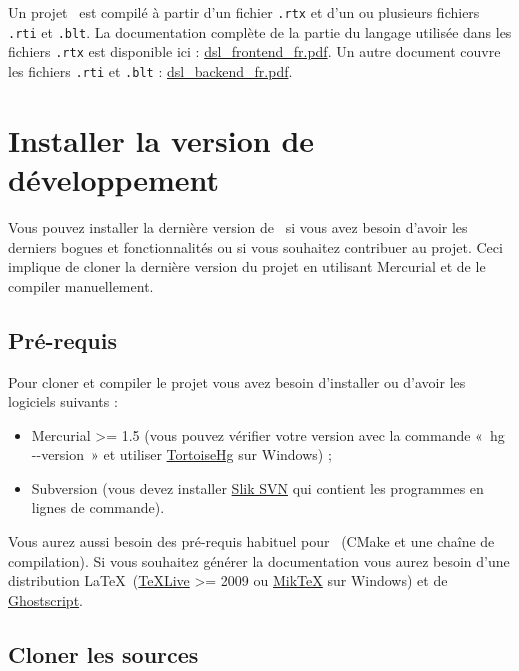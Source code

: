\documentclass[francais]{rtxarticle}
\begin{document}
Un projet \rtx\ est compilé à partir d'un fichier \texttt{.rtx} et d'un ou
plusieurs fichiers \texttt{.rti} et \texttt{.blt}. La documentation complète de
la partie du langage utilisée dans les fichiers \texttt{.rtx} est disponible
ici : \href{http://rathaxes.googlecode.com/files/dsl_frontend_fr.pdf}{dsl\_frontend\_fr.pdf}.
Un autre document couvre les fichiers \texttt{.rti} et \texttt{.blt} :
\href{http://rathaxes.googlecode.com/files/dsl_backend_fr.pdf}{dsl\_backend\_fr.pdf}.

\section{Installer la version de développement}

Vous pouvez installer la dernière version de \rtx\ si vous avez besoin d'avoir
les derniers bogues et fonctionnalités ou si vous souhaitez contribuer au
projet. Ceci implique de cloner la dernière version du projet en utilisant
Mercurial et de le compiler manuellement.

\subsection{Pré-requis}

Pour cloner et compiler le projet vous avez besoin d'installer ou d'avoir les
logiciels suivants :
\begin{itemize}
\item Mercurial >= 1.5 (vous pouvez vérifier votre version avec la commande
      «~hg {-}{-}version~» et utiliser
      \href{http://tortoisehg.bitbucket.org/download/index.html}{TortoiseHg}
      sur Windows) ;
\item Subversion (vous devez installer
      \href{http://www.sliksvn.com/en/download}{Slik SVN} qui contient les
      programmes en lignes de commande).
\end{itemize}

Vous aurez aussi besoin des pré-requis habituel pour \rtx\ (CMake et une chaîne
de compilation). Si vous souhaitez générer la documentation vous aurez besoin
d'une distribution \LaTeX\ (\href{http://www.tug.org/texlive/}{\TeX Live} >= 2009
ou \href{http://www.miktex.org/}{Mik\TeX} sur Windows) et de
\href{http://pages.cs.wisc.edu/~ghost/}{Ghostscript}.

\subsection{Cloner les sources}
\end{document}

